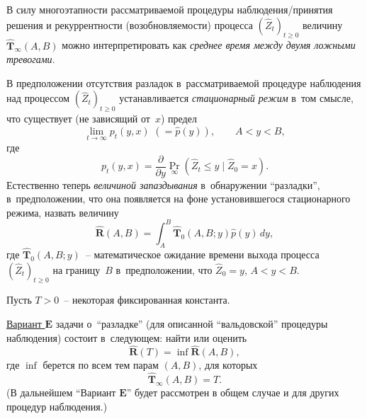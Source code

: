 В силу многоэтапности рассматриваемой процедуры
на\-блю\-де\-ния/при\-ня\-тия решения и рекуррентности
(возобновляемости) процесса $(\widehat{Z}_t)_{t\ge0}$ величину
$\widehat{\mathbf{T}}_{\infty}(A,B)$ можно интерпретировать как
\textit{среднее время между двумя ложными тревогами}.

В предположении отсутствия разладок в~рассматриваемой процедуре
наблюдения над процессом $(\widehat{Z}_t)_{t\ge0}$ устанавливается
\textit{стационарный режим} в~том смысле, что существует (не
зависящий от~$x$) предел
\begin{equation}
\label{215}%
\lim_{t\to\infty}p_t(y,x)
\,\,(=\widehat{p}(y)),
\qquad A<y<B,
\end{equation}
где
\begin{equation}
\label{216}%
p_t(y,x)=\frac{\partial}{\partial y}\Pr_{\infty}
(\widehat{Z}_t\le y\mid\widehat{Z}_0=x).
\end{equation}
Естественно теперь \textit{величиной запаздывания} в~обнаружении
``разладки'', в~предположении, что она появляется на фоне
установившегося стационарного режима, назвать величину
\begin{equation}
\label{217}%
\widehat{\mathbf{R}}(A,B)
=\int_A^B\widehat{\mathbf{T}}_0(A,B;y)\widehat{p}(y)\,dy,
\end{equation}
где $\widehat{\mathbf{T}}_0(A,B;y)$~-- математическое ожидание
времени выхода процесса $(\widehat{Z}_t)_{t\ge0}$ на границу~$B$
в~предположении, что $\widehat{Z}_0=y$, $A<y<B$.

Пусть $T>0$~-- некоторая фиксированная константа.

\underline{Вариант $\mathbf{E}$} задачи о~``разладке'' (для
описанной ``вальдовской'' процедуры наблюдения) состоит
в~следующем: найти или оценить
\begin{equation}
\label{218}%
\widehat{\mathbf{R}}(T)=\inf\widehat{\mathbf{R}}(A,B),
\end{equation}
где $\inf$ берется по всем тем парам $(A,B)$, для которых
\begin{equation}
\label{219}%
\widehat{\mathbf{T}}_{\infty}(A,B)=T.
\end{equation}
(В дальнейшем ``Вариант $\mathbf{E}$'' будет рассмотрен в общем
случае и для других процедур наблюдения.)